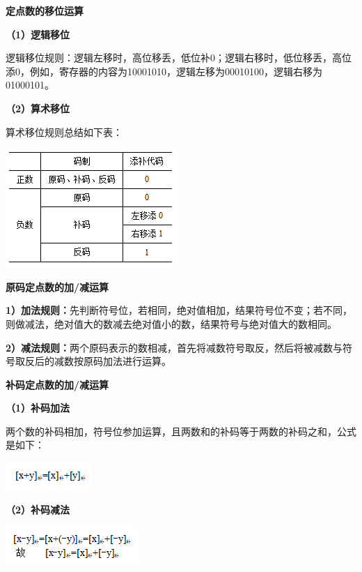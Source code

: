\textbf{{定点数的移位运算}}

\textbf{（1）逻辑移位}

逻辑移位规则：逻辑左移时，高位移丢，低位补0；逻辑右移时，低位移丢，高位添0，例如，寄存器的内容为10001010，逻辑左移为00010100，逻辑右移为01000101。

\textbf{（2）算术移位}

算术移位规则总结如下表：

\includegraphics[width=2.55208in,height=1.77083in]{png-jpeg-pics/6702B9B4984FC8F172C1A131535E1BB7.png}

{\textbf{原码定点数的加}}{\textbf{/}}{\textbf{减运算}}

{{\textbf{1）加法规则：}先判断符号位，若相同，绝对值相加，结果符号位不变；若不同，则做减法，绝对值大的数减去绝对值小的数，结果符号与绝对值大的数相同。}}

{\textbf{2）减法规则：}两个原码表示的数相减，首先将减数符号取反，然后将被减数与符号取反后的减数按原码加法进行运算。}

{{\textbf{补码定点数的加/减运算}}{\textbf{}}\\
}

{{\textbf{{（1）补码加法}}}}

{两个数的补码相加，符号位参加运算，且两数和的补码等于两数的补码之和，公式是如下：}

{\includegraphics[width=1.29167in,height=0.41667in]{png-jpeg-pics/3F34CD6B8EAA9A7F1C52ECACA7825AF7.png}\\
}

\textbf{（2）补码减法}

\textbf{\includegraphics[width=1.97917in,height=0.60417in]{png-jpeg-pics/4CCA533CE368F5FECF12C90D5D4DA66C.png}\\
}

